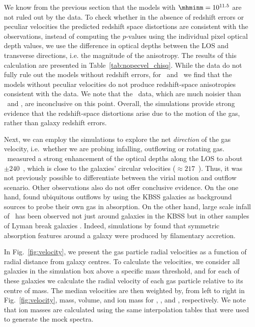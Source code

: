 \documentclass[useAMS,usenatbib,letterpaper]{mn2e}
\def\obspaper{\citetalias{turner14}}
\begin{document}
We know from the previous section that the models with $\mhminm=10^{11.5}$ are
not ruled out by the data. To check whether in the absence of redshift errors or
peculiar velocities the predicted redshift space distortions 
are consistent with the observations, instead of computing the $p$-values
using the individual pixel optical depth values, we use the difference in optical depths
between the LOS and transverse directions, i.e. the magnitude of the anisotropy. 
The results of this calculation are presented in Table~\ref{tab:nopecvel_chisq}.
While the data do not fully rule out the models without redshift errors, 
for \hone\ and \cfour\ we find that the models without peculiar velocities
do not produce redshift-space anisotropies consistent with the data.
We note that the \sifour\ data, which are much noisier than 
\hone\ and \sifour, are inconclusive on this point.
Overall, the simulations provide strong 
evidence that the redshift-space distortions arise due to the
motion of the gas, rather than galaxy redshift errors.  

Next, we can employ the simulations to explore the net \textit{direction} of the gas velocity, i.e.\ whether we are 
probing infalling, outflowing or rotating gas.
\obspaper\ measured a strong enhancement of the optical depths along the LOS to
about $\pm240$~\kmps, which is
close to the galaxies' circular velocities
($\approx217$~\kmps). Thus, it was not previously possible to differentiate
between the virial motion and outflow scenario. 
Other observations also do not offer conclusive evidence. On the one hand, 
\citet{steidel10} found ubiquitous outflows by 
using the KBSS galaxies as background sources to probe their own gas 
in absorption.
On the other hand, large scale infall of \hone\ has been observed not just around
galaxies in the KBSS \citep{rakic12}
but in other samples of Lyman break galaxies \citep[e.g.,][]{bielby16}. 
Indeed, simulations by \citet{kawata07} found that symmetric absorption features 
around a galaxy were produced by filamentary accretion. 

In Fig.~\ref{fig:velocity}, we present the
gas particle radial velocities as a function of radial distance from galaxy centres.
To calculate the velocities, we consider all galaxies in the simulation box above a specific mass threshold, 
and for each of these galaxies we calculate the radial velocity of each gas particle relative to 
its centre of mass. 
The median velocities are then weighted by, from left to right in 
Fig.~\ref{fig:velocity}, mass, volume, and ion mass for 
\hone, \cfour, and \sifour, respectively. 
We note that ion masses are calculated using the same interpolation 
tables that were used to generate the mock spectra.
\end{document}
